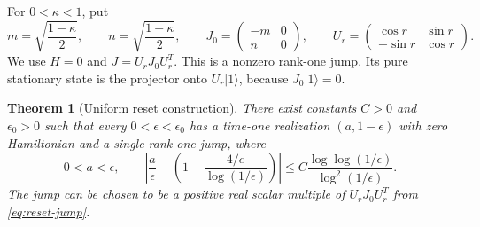 \documentclass[11pt]{article}
\newtheorem{theorem}{Theorem}[section]
\theoremstyle{definition}
\theoremstyle{remark}
\begin{document}
For \(0<\kappa<1\), put
\begin{equation}\label{eq:reset-jump}
 m=\sqrt{\frac{1-\kappa}{2}},\qquad n=\sqrt{\frac{1+\kappa}{2}},\qquad
 J_0=\begin{pmatrix}-m&0\\n&0\end{pmatrix},\qquad
 U_r=\begin{pmatrix}\cos r&\sin r\\-\sin r&\cos r\end{pmatrix}.
\end{equation}
We use \(H=0\) and \(J=U_rJ_0U_r^T\). This is a nonzero rank-one jump. Its pure stationary state is the projector onto \(U_r|1\rangle\), because \(J_0|1\rangle=0\).

\begin{theorem}[Uniform reset construction]\label{thm:reset}
There exist constants \(C>0\) and \(\epsilon_0>0\) such that every \(0<\epsilon<\epsilon_0\) has a time-one realization \((a,1-\epsilon)\) with zero Hamiltonian and a single rank-one jump, where
\begin{equation}\label{eq:reset-remainder}
 0<a<\epsilon,\qquad
 \left|\frac a\epsilon-\left(1-\frac{4/e}{\log(1/\epsilon)}\right)\right|
 \leq C\frac{\log\log(1/\epsilon)}{\log^2(1/\epsilon)}.
\end{equation}
The jump can be chosen to be a positive real scalar multiple of \(U_rJ_0U_r^T\) from \eqref{eq:reset-jump}.
\end{theorem}
\end{document}
